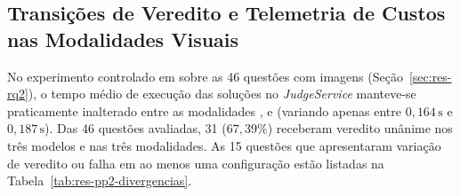 \subsection{Transições de Veredito e Telemetria de Custos nas Modalidades Visuais}\label{sec:res-rq2-custo}

No experimento controlado em  sobre as 46 questões com imagens (Seção~\ref{sec:res-rq2}), o tempo médio de execução das soluções no \textit{JudgeService} manteve-se praticamente inalterado entre as modalidades ,  e  (variando apenas entre $0{,}164\,\mathrm{s}$ e $0{,}187\,\mathrm{s}$). Das 46 questões avaliadas, 31 ($67{,}39\%$) receberam veredito  unânime nos três modelos e nas três modalidades. As 15 questões que apresentaram variação de veredito ou falha em ao menos uma configuração estão listadas na Tabela~\ref{tab:res-pp2-divergencias}.

